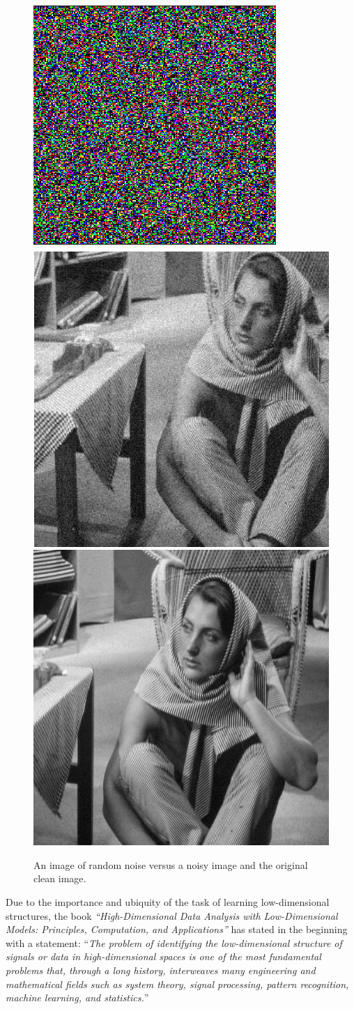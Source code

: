\documentclass[../../book-main.tex]{subfiles}
\begin{document}
\begin{figure}
    \centering
    \includegraphics[height=0.30\linewidth]{figures/Gaussian-noise.png}\hspace{2mm} \includegraphics[height=0.30\linewidth]{figs_chap1/Standard-test-image-Barbara-of-size-512-512-pixels-including-Gaussian-noise-with.png} \hspace{2mm} \includegraphics[height=0.30\linewidth]{figs_chap1/barbara.jpg}
    \caption{An image of random noise versus a noisy image and the original clean image. %
    }
    \label{fig:noise-image}
\end{figure}

Due to the importance and ubiquity of the task of  learning low-dimensional structures, the book {\em ``High-Dimensional Data Analysis with Low-Dimensional Models: Principles, Computation, and Applications''} \cite{Wright-Ma-2022} has stated in the beginning with a statement: ``{\em The problem of identifying the low-dimensional structure of signals or data in high-dimensional
spaces is one of the most fundamental problems that, through a long
history, interweaves many engineering and mathematical fields such as system
theory, signal processing, pattern recognition, machine learning, and statistics.}''
\end{document}
